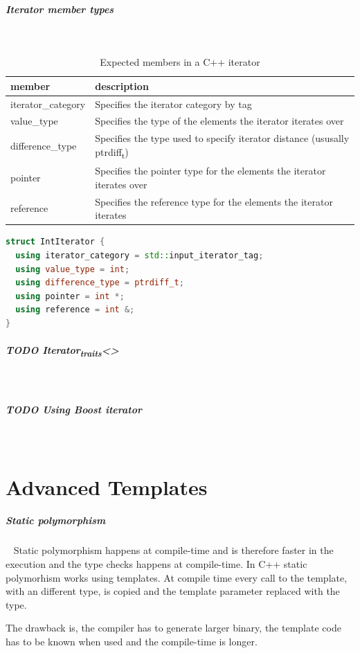 \documentclass[11pt,twoside,landscape]{article}
\begin{document}
\begin{multicols}{2}
\subparagraph{Iterator member types} \
\label{sec:orge3975b4}
\begin{table}[htbp]
\caption{\label{tbl:expected-members-in-a-cpp-iterator}Expected members in a C++ iterator}
\centering
\begin{tabular}{ll}
member & description\\[0pt]
\hline
iterator\_category & Specifies the iterator category by tag\\[0pt]
value\_type & Specifies the type of the elements the iterator iterates over\\[0pt]
difference\_type & Specifies the type used to specify iterator distance (ususally ptrdiff\textsubscript{t})\\[0pt]
pointer & Specifies the pointer type for the elements the iterator iterates over\\[0pt]
reference & Specifies the reference type for the elements the iterator iterates\\[0pt]
\end{tabular}
\end{table}


\begin{lstlisting}[language=c++,label=lst:example-member-types-for-an-iterator,caption={Example member types for an iterator},captionpos=b,numbers=none]
struct IntIterator {
  using iterator_category = std::input_iterator_tag;
  using value_type = int;
  using difference_type = ptrdiff_t;
  using pointer = int *;
  using reference = int &;
}
\end{lstlisting}

\subparagraph{{\bfseries\sffamily TODO} Iterator\textsubscript{traits}<>} \
\label{sec:orgcf0d478}
\subparagraph{{\bfseries\sffamily TODO} Using Boost iterator} \
\label{sec:org487d4ad}
\section{Advanced Templates}
\label{sec:orgbee043e}
\subparagraph{Static polymorphism} \
\label{sec:org9c62826}
Static polymorphism happens at compile-time and is therefore faster in the execution and the type checks happens at compile-time.
In C++ static polymorhism works using templates.
At compile time every call to the template, with an different type, is copied and the template parameter replaced with the type.

The drawback is, the compiler has to generate larger binary, the template code has to be known when used and the compile-time is longer.


\end{multicols}
\end{document}
